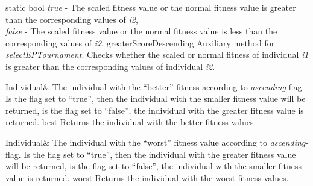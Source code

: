 \setNormalInstance
\setCorrectWidthThree{8pt}
\printMethodWithParamsSaved
{static bool}
{
 {\em true} - The scaled fitness value or the normal fitness value
              is greater than the corresponding values of {\em i2},\\
 {\em false} - The scaled fitness value or the normal fitness value
               is less than the corresponding values of {\em i2}.}
{greaterScoreDescending}
{Auxiliary method for {\em selectEPTournament}.
 Checks whether the scaled or normal fitness of individual {\em i1} 
 is greater than the corresponding values of individual {\em i2}.}
{}
\setCorrectWidthThree{4pt}

\clearpage

\setConstInstance
\setCorrectWidthThree{8pt}
\printMethodWithParamsSaved
{Individual\&}
{The individual with the ``better'' fitness according to 
 {\em ascending}-flag. Is the flag set to ``true'',
 then the individual with the smaller fitness value will be returned, is
 the flag set to ``false'', the individual with the greater fitness
 value is returned.}
{best}
{Returns the individual with the better fitness values.}
{}
\setCorrectWidthThree{4pt}

\vspace*{4ex}

\setConstInstance
\setCorrectWidthThree{8pt}
\printMethodWithParamsSaved
{Individual\&}
{The individual with the ``worst'' fitness value according
 to {\em ascending}-flag. Is the flag set to ``true'',
 then the individual with the greater fitness value will be returned, is
 the flag set to ``false'', the individual with the smaller fitness
 value is returned.}
{worst}
{Returns the individual with the worst fitness values.}
{}
\setCorrectWidthThree{4pt}

